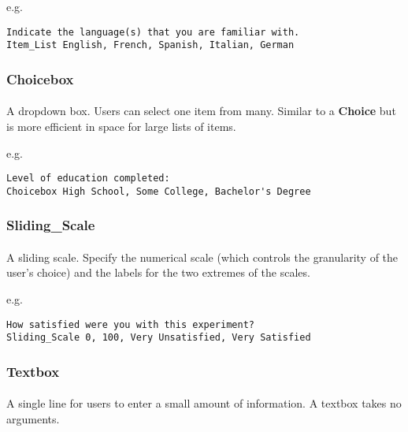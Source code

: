 e.g.

\begin{lstlisting}
Indicate the language(s) that you are familiar with.
Item_List English, French, Spanish, Italian, German
\end{lstlisting}

\subsubsection{Choicebox}

\paragraph{}
A dropdown box.  Users can select one item from many.  Similar to a \textbf{Choice} but is more efficient in space for large lists of items.

e.g.

\begin{lstlisting}
Level of education completed:
Choicebox High School, Some College, Bachelor's Degree
\end{lstlisting}

\subsubsection{Sliding\_Scale}

\paragraph{}
A sliding scale.  Specify the numerical scale (which controls the granularity of the user's choice) and the labels for the two extremes of the scales.

e.g.

\begin{lstlisting}
How satisfied were you with this experiment?
Sliding_Scale 0, 100, Very Unsatisfied, Very Satisfied
\end{lstlisting}

\subsubsection{Textbox}

\paragraph{}
A single line for users to enter a small amount of information.  A textbox takes no arguments.

